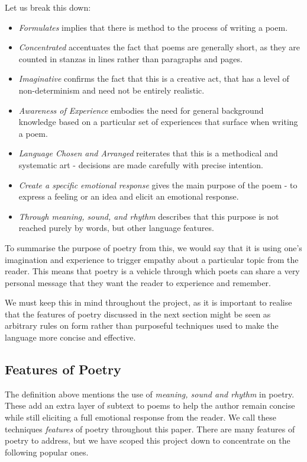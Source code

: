 Let us break this down:
\begin{itemize}
\item{\textit{Formulates} implies that there is method to the process of writing a poem.}
\item{\textit{Concentrated} accentuates the fact that poems are generally short, as they are counted in stanzas in lines rather than paragraphs and pages.}
\item{\textit{Imaginative} confirms the fact that this is a creative act, that has a level of non-determinism and need not be entirely realistic.}
\item{\textit{Awareness of Experience} embodies the need for general background knowledge based on a particular set of experiences that surface when writing a poem.}
\item{\textit{Language Chosen and Arranged} reiterates that this is a methodical and systematic art - decisions are made carefully with precise intention.}
\item{\textit{Create a specific emotional response} gives the main purpose of the poem - to express a feeling or an idea and elicit an emotional response.}
\item{\textit{Through meaning, sound, and rhythm} describes that this purpose is not reached purely by words, but other language features.}
\end{itemize}

To summarise the purpose of poetry from this, we would say that it is using one's imagination and experience to trigger empathy about a particular topic from the reader. This means that poetry is a vehicle through which poets can share a very personal message that they want the reader to experience and remember. 

We must keep this in mind throughout the project, as it is important to realise that the features of poetry discussed in the next section might be seen as arbitrary rules on form rather than purposeful techniques used to make the language more concise and effective.

\subsection{Features of Poetry}
\label{sec:features}

The definition above mentions the use of \textit{meaning, sound and rhythm} in poetry. These add an extra layer of subtext to poems to help the author remain concise while still eliciting a full emotional response from the reader. We call these techniques \textit{features} of poetry throughout this paper. There are many features of poetry to address, but we have scoped this project down to concentrate on the following popular ones.

